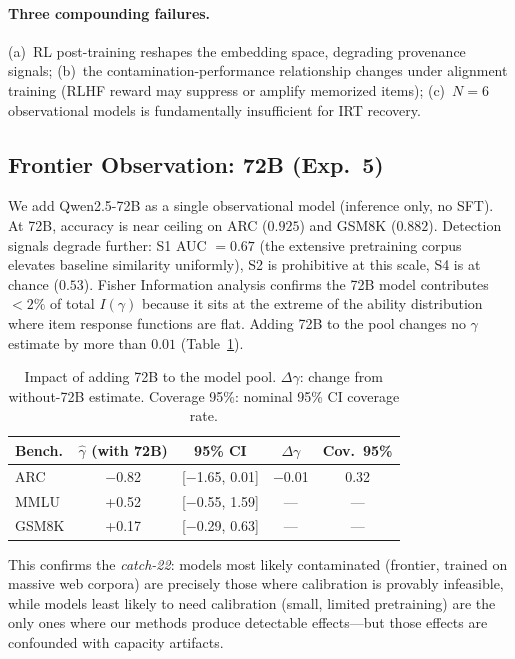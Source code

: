 \documentclass[11pt,a4paper]{article}
\newcommand{\gam}{\gamma}
\begin{document}
\paragraph{Three compounding failures.}
(a)~RL post-training reshapes the embedding space, degrading provenance signals;
(b)~the contamination-performance relationship changes under alignment training (RLHF reward may suppress or amplify memorized items);
(c)~$N = 6$ observational models is fundamentally insufficient for IRT recovery.

\subsection{Frontier Observation: 72B (Exp.~5)}
\label{sec:exp_72b}

We add Qwen2.5-72B as a single observational model (inference only, no SFT).
At 72B, accuracy is near ceiling on ARC ($0.925$) and GSM8K ($0.882$).
Detection signals degrade further: S1 AUC $= 0.67$ (the extensive pretraining corpus elevates baseline similarity uniformly), S2 is prohibitive at this scale, S4 is at chance ($0.53$).
Fisher Information analysis confirms the 72B model contributes $< 2\%$ of total $I(\gam)$ because it sits at the extreme of the ability distribution where item response functions are flat.
Adding 72B to the pool changes no $\gam$ estimate by more than $0.01$ (Table~\ref{tab:72b}).

\begin{table}[t]
\centering
\small
\caption{Impact of adding 72B to the model pool. $\Delta\gam$: change from without-72B estimate. Coverage 95\%: nominal 95\% CI coverage rate.}
\label{tab:72b}
\begin{tabular}{lcccc}
\toprule
\textbf{Bench.} & $\hat{\gam}$ (with 72B) & 95\% CI & $\Delta\gam$ & Cov.\ 95\% \\
\midrule
ARC   & $-$0.82 & [$-$1.65, 0.01] & $-$0.01 & 0.32 \\
MMLU  & +0.52   & [$-$0.55, 1.59] & --- & --- \\
GSM8K & +0.17   & [$-$0.29, 0.63] & --- & --- \\
\bottomrule
\end{tabular}
\end{table}

This confirms the \emph{catch-22}: models most likely contaminated (frontier, trained on massive web corpora) are precisely those where calibration is provably infeasible, while models least likely to need calibration (small, limited pretraining) are the only ones where our methods produce detectable effects---but those effects are confounded with capacity artifacts.
\end{document}
